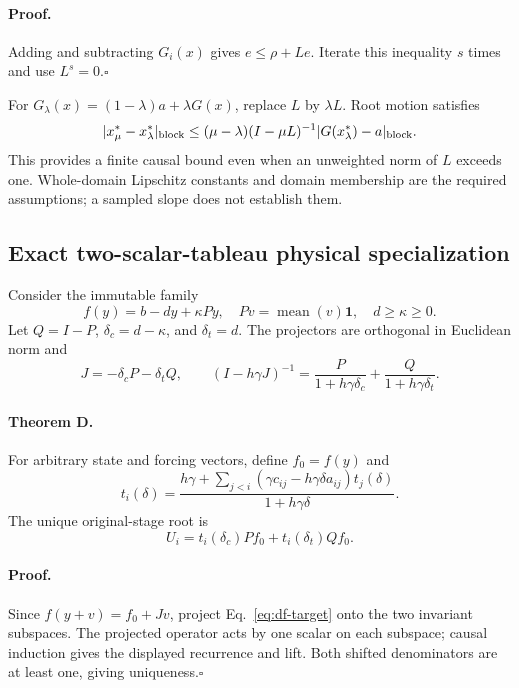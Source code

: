 \paragraph{Proof.}
Adding and subtracting $G_i(x)$ gives $e\le\rho+Le$.
Iterate this inequality $s$ times and use $L^s=0$.\hfill$\square$

For $G_\lambda(x)=(1-\lambda)a+\lambda G(x)$, replace $L$ by
$\lambda L$. Root motion satisfies
\begin{equation}
 |x^*_\mu-x^*_\lambda|_{\rm block}
 \le(\mu-\lambda)(I-\mu L)^{-1}|G(x^*_\lambda)-a|_{\rm block}.
\end{equation}
This provides a finite causal bound even when an unweighted norm of $L$
exceeds one. Whole-domain Lipschitz constants and domain membership are
the required assumptions; a sampled slope does not establish them.

\subsection{Exact two-scalar-tableau physical specialization}

Consider the immutable family
\begin{equation}
 f(y)=b-dy+\kappa P y,\quad Pv=\operatorname{mean}(v)\boldsymbol{1},
 \quad d\ge\kappa\ge0.
\end{equation}
Let $Q=I-P$, $\delta_c=d-\kappa$, and $\delta_t=d$.
The projectors are orthogonal in Euclidean norm and
\begin{equation}
 J=-\delta_cP-\delta_tQ,\qquad
 (I-h\gamma J)^{-1}=
 \frac{P}{1+h\gamma\delta_c}+\frac{Q}{1+h\gamma\delta_t}.
\end{equation}

\paragraph{Theorem D.}
For arbitrary state and forcing vectors, define $f_0=f(y)$ and
\begin{equation}
 t_i(\delta)=\frac{h\gamma+
 \sum_{j<i}(\gamma c_{ij}-h\gamma\delta a_{ij})t_j(\delta)}
 {1+h\gamma\delta}.
\end{equation}
The unique original-stage root is
\begin{equation}
 U_i=t_i(\delta_c)P f_0+t_i(\delta_t)Q f_0.
\end{equation}

\paragraph{Proof.}
Since $f(y+v)=f_0+Jv$, project Eq.~\eqref{eq:df-target} onto the two invariant
subspaces. The projected operator acts by one scalar on each subspace;
causal induction gives the displayed recurrence and lift. Both shifted
denominators are at least one, giving uniqueness.\hfill$\square$

